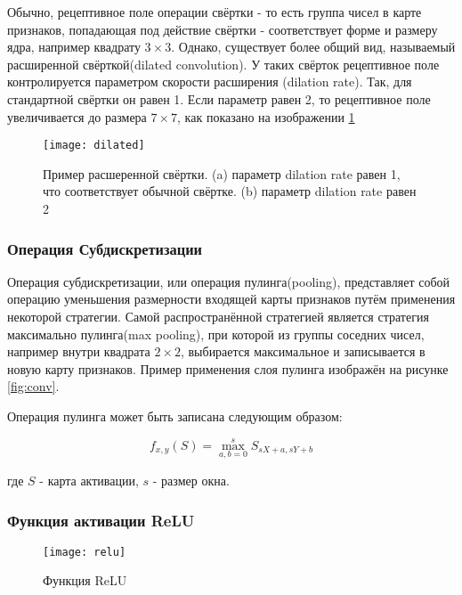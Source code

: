 Обычно, рецептивное поле операции свёртки - то есть группа чисел в карте признаков, попадающая под действие свёртки -
соответствует форме и размеру ядра, например квадрату $3 \times 3$. Однако, существует более общий вид,
называемый расширенной свёрткой(dilated convolution)\cite{Dilated}. У таких свёрток рецептивное поле контролируется параметром скорости
расширения (dilation rate). Так, для стандартной свёртки он равен 1. Если параметр равен 2, то рецептивное поле увеличивается
до размера $7 \times 7$, как показано на изображении \ref{fig:dilated}

\begin{figure}[h]
    \centering
    \texttt{[image: dilated]}
    \caption{Пример расшеренной свёртки.     (a) параметр dilation rate равен 1, что соответствует обычной свёртке. (b) параметр dilation rate равен 2}
    \label{fig:dilated}
\end{figure}


\subsubsection{Операция Субдискретизации}

Операция субдискретизации, или операция пулинга(pooling), представляет собой операцию уменьшения размерности входящей карты признаков
путём применения некоторой стратегии. Самой распространённой стратегией является стратегия максимально пулинга(max pooling),
при которой из группы соседних чисел, например внутри квадрата $2 \times 2$, выбирается максимальное и записывается в новую
карту признаков. Пример применения слоя пулинга изображён на рисунке \ref{fig:conv}.


Операция пулинга может быть записана следующим образом:

\begin{equation}
    f_{x,y}(S) = \max_{a,b=0}^{s}S_{sX+a, sY+b}
\end{equation}

где $S$ - карта активации, $s$ - размер окна.

\subsubsection{Функция активации ReLU}

\begin{figure}[h]
    \centering
    \texttt{[image: relu]}
    \caption{Функция ReLU}
    \label{fig:relu}
\end{figure}


